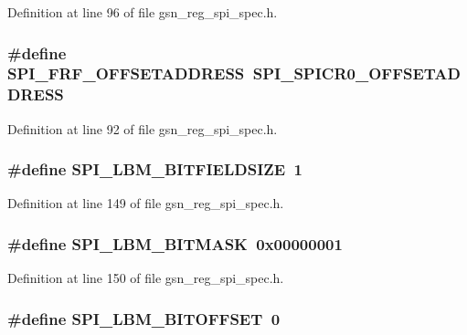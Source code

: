 Definition at line 96 of file gsn\_\-reg\_\-spi\_\-spec.h.

\hypertarget{a00573_a4cd3577861a0c1160cd3c207ad5e727e}{
\subsubsection[{SPI\_\-FRF\_\-OFFSETADDRESS}]{\setlength{\rightskip}{0pt plus 5cm}\#define SPI\_\-FRF\_\-OFFSETADDRESS~SPI\_\-SPICR0\_\-OFFSETADDRESS}}
\label{a00573_a4cd3577861a0c1160cd3c207ad5e727e}


Definition at line 92 of file gsn\_\-reg\_\-spi\_\-spec.h.

\hypertarget{a00573_aad5a1b1b47d9b6441701b4bccf01552a}{
\subsubsection[{SPI\_\-LBM\_\-BITFIELDSIZE}]{\setlength{\rightskip}{0pt plus 5cm}\#define SPI\_\-LBM\_\-BITFIELDSIZE~1}}
\label{a00573_aad5a1b1b47d9b6441701b4bccf01552a}


Definition at line 149 of file gsn\_\-reg\_\-spi\_\-spec.h.

\hypertarget{a00573_ac4d3af9e2265216d54fdf20542a844a3}{
\subsubsection[{SPI\_\-LBM\_\-BITMASK}]{\setlength{\rightskip}{0pt plus 5cm}\#define SPI\_\-LBM\_\-BITMASK~0x00000001}}
\label{a00573_ac4d3af9e2265216d54fdf20542a844a3}


Definition at line 150 of file gsn\_\-reg\_\-spi\_\-spec.h.

\hypertarget{a00573_a30460110478a79b3f10dd022a86afe06}{
\subsubsection[{SPI\_\-LBM\_\-BITOFFSET}]{\setlength{\rightskip}{0pt plus 5cm}\#define SPI\_\-LBM\_\-BITOFFSET~0}}
\label{a00573_a30460110478a79b3f10dd022a86afe06}


